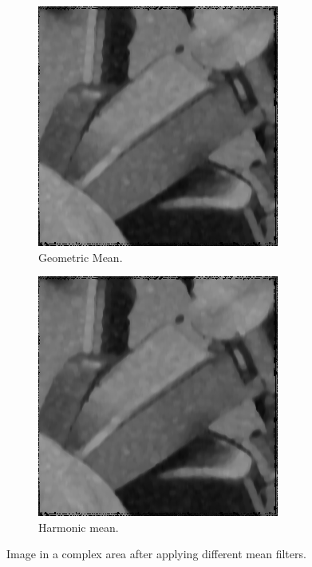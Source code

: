 \begin{figure}[H]
  \begin{subfigure}{\cutOutWidth}
    \includegraphics[width = \textwidth]{graphics/complex1_blurred.png}
    \caption{Geometric Mean.}
    \label{fig:complex1_after_blur}
  \end{subfigure}
%
  \begin{subfigure}{\cutOutWidth}
    \includegraphics[width = \textwidth]{graphics/complex1_harmonic_blurred.png}
    \caption{Harmonic mean.}
    \label{fig:complex1_after_harmonic}
  \end{subfigure}
\caption{Image in a complex area after applying different mean filters.}
\end{figure}

